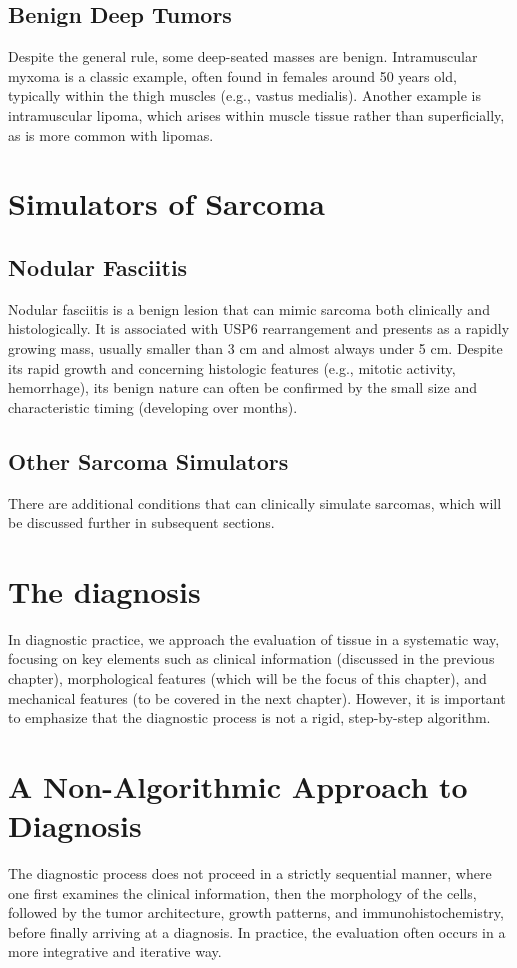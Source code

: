 \subsection{Benign Deep Tumors}
Despite the general rule, some deep-seated masses are benign. Intramuscular myxoma is a classic example, often found in females around 50 years old, typically within the thigh muscles (e.g., vastus medialis). Another example is intramuscular lipoma, which arises within muscle tissue rather than superficially, as is more common with lipomas.

\section{Simulators of Sarcoma}
\subsection{Nodular Fasciitis}
Nodular fasciitis is a benign lesion that can mimic sarcoma both clinically and histologically. It is associated with USP6 rearrangement and presents as a rapidly growing mass, usually smaller than 3 cm and almost always under 5 cm. Despite its rapid growth and concerning histologic features (e.g., mitotic activity, hemorrhage), its benign nature can often be confirmed by the small size and characteristic timing (developing over months).

\subsection{Other Sarcoma Simulators}
There are additional conditions that can clinically simulate sarcomas, which will be discussed further in subsequent sections.

\section{The diagnosis}

In diagnostic practice, we approach the evaluation of tissue in a systematic way, focusing on key elements such as clinical information (discussed in the previous chapter), morphological features (which will be the focus of this chapter), and mechanical features (to be covered in the next chapter). However, it is important to emphasize that the diagnostic process is not a rigid, step-by-step algorithm.

\section{A Non-Algorithmic Approach to Diagnosis}
The diagnostic process does not proceed in a strictly sequential manner, where one first examines the clinical information, then the morphology of the cells, followed by the tumor architecture, growth patterns, and immunohistochemistry, before finally arriving at a diagnosis. In practice, the evaluation often occurs in a more integrative and iterative way. 

